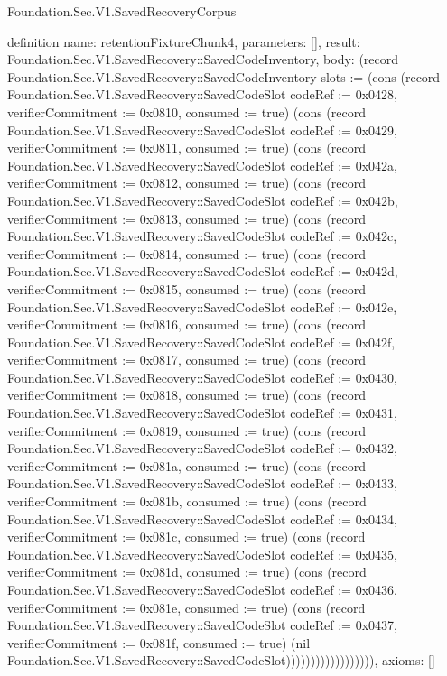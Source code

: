 \begin{lexlean}{Foundation.Sec.V1.SavedRecoveryCorpus}
\begin{semanticmodule}
definition{
  name: retentionFixtureChunk4,
  parameters: [],
  result: Foundation.Sec.V1.SavedRecovery::SavedCodeInventory,
  body: (record Foundation.Sec.V1.SavedRecovery::SavedCodeInventory {slots := (cons (record Foundation.Sec.V1.SavedRecovery::SavedCodeSlot {codeRef := 0x0428, verifierCommitment := 0x0810, consumed := true}) (cons (record Foundation.Sec.V1.SavedRecovery::SavedCodeSlot {codeRef := 0x0429, verifierCommitment := 0x0811, consumed := true}) (cons (record Foundation.Sec.V1.SavedRecovery::SavedCodeSlot {codeRef := 0x042a, verifierCommitment := 0x0812, consumed := true}) (cons (record Foundation.Sec.V1.SavedRecovery::SavedCodeSlot {codeRef := 0x042b, verifierCommitment := 0x0813, consumed := true}) (cons (record Foundation.Sec.V1.SavedRecovery::SavedCodeSlot {codeRef := 0x042c, verifierCommitment := 0x0814, consumed := true}) (cons (record Foundation.Sec.V1.SavedRecovery::SavedCodeSlot {codeRef := 0x042d, verifierCommitment := 0x0815, consumed := true}) (cons (record Foundation.Sec.V1.SavedRecovery::SavedCodeSlot {codeRef := 0x042e, verifierCommitment := 0x0816, consumed := true}) (cons (record Foundation.Sec.V1.SavedRecovery::SavedCodeSlot {codeRef := 0x042f, verifierCommitment := 0x0817, consumed := true}) (cons (record Foundation.Sec.V1.SavedRecovery::SavedCodeSlot {codeRef := 0x0430, verifierCommitment := 0x0818, consumed := true}) (cons (record Foundation.Sec.V1.SavedRecovery::SavedCodeSlot {codeRef := 0x0431, verifierCommitment := 0x0819, consumed := true}) (cons (record Foundation.Sec.V1.SavedRecovery::SavedCodeSlot {codeRef := 0x0432, verifierCommitment := 0x081a, consumed := true}) (cons (record Foundation.Sec.V1.SavedRecovery::SavedCodeSlot {codeRef := 0x0433, verifierCommitment := 0x081b, consumed := true}) (cons (record Foundation.Sec.V1.SavedRecovery::SavedCodeSlot {codeRef := 0x0434, verifierCommitment := 0x081c, consumed := true}) (cons (record Foundation.Sec.V1.SavedRecovery::SavedCodeSlot {codeRef := 0x0435, verifierCommitment := 0x081d, consumed := true}) (cons (record Foundation.Sec.V1.SavedRecovery::SavedCodeSlot {codeRef := 0x0436, verifierCommitment := 0x081e, consumed := true}) (cons (record Foundation.Sec.V1.SavedRecovery::SavedCodeSlot {codeRef := 0x0437, verifierCommitment := 0x081f, consumed := true}) (nil Foundation.Sec.V1.SavedRecovery::SavedCodeSlot)))))))))))))))))}),
  axioms: []
}


\end{semanticmodule}
\end{lexlean}
